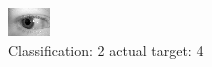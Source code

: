 \begin{figure}[h!]
\begin{center}
\includegraphics[width=0.60\columnwidth]{figures/ID784_class_2_target_4.png}
\end{center}
\caption{ Classification: 2 actual target: 4}
\label{fig:ID784_class_2_target_4}
\end{figure}
